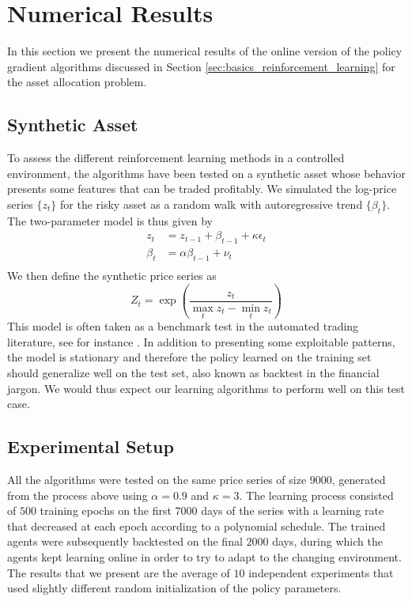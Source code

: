 \section{Numerical Results}
\label{sec:numerical_results}

In this section we present the numerical results of the online version of the policy gradient algorithms discussed in Section \ref{sec:basics_reinforcement_learning} for the asset allocation problem. 

\subsection{Synthetic Asset}
To assess the different reinforcement learning methods in a controlled environment, the algorithms have been tested on a synthetic asset whose behavior presents some features that can be traded profitably. We simulated the log-price series $\{z_t\}$ for the risky asset as a random walk with autoregressive trend $\{\beta_t\}$. The two-parameter model is thus given by
\begin{equation}
	\begin{split}
		z_t &= z_{t-1} + \beta_{t-1} + \kappa \epsilon_t\\
		\beta_t &= \alpha \beta_{t-1} + \nu_t\\
	\end{split}
\end{equation}
We then define the synthetic price series as
\begin{equation}
	Z_t = \exp\left(\frac{z_t}{\max_t z_t - \min_t z_t}\right)
\end{equation}
This model is often taken as a benchmark test in the automated trading literature, see for instance \cite{moody1998performance}. In addition to presenting some exploitable patterns, the model is stationary and therefore the policy learned on the training set should generalize well on the test set, also known as backtest in the financial jargon. We would thus expect our learning algorithms to perform well on this test case. 

\subsection{Experimental Setup}   
All the algorithms were tested on the same price series of size $9000$, generated from the process above using $\alpha = 0.9$ and $\kappa = 3$. The learning process consisted of $500$ training epochs on the first $7000$ days of the series with a learning rate that decreased at each epoch according to a polynomial schedule. The trained agents were subsequently backtested on the final $2000$ days, during which the agents kept learning online in order to try to adapt to the changing environment. The results that we present are the average of $10$ independent experiments that used slightly different random initialization of the policy parameters.   

